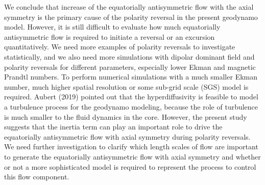 We conclude that increase of the equatorially antisymmetric flow with the axial symmetry is the primary cause of the polarity reversal in the present geodynamo model. 
However, it is still difficult to evaluate how much equatorially antisymmetric flow is required to initiate a reversal or an excursion quantitatively. 
We need more examples of polarity reversals to investigate statistically, and we also need more simulations with dipolar dominant field and polarity reversals for different parameters, especially lower Ekman and magnetic Prandtl numbers. 
To perform numerical simulations with a much smaller Ekman number, much higher spatial resolution or some sub-grid scale (SGS) model is required. 
Aubert (2019) pointed out that the hyperdiffusivity is feasible to model a turbulence process for the geodynamo modeling, because the role of turbulence is much smaller to the fluid dynamics in the core. 
However, the present study suggests that the inertia term can play an important role to drive the equatorially antisymmetric flow with axial symmetry during polarity reversals. 
We need further investigation to clarify which length scales of flow are important to generate the equatorially antisymmetric flow with axial symmetry and whether or not a more sophisticated model is required to represent the process to control this flow component.

%
